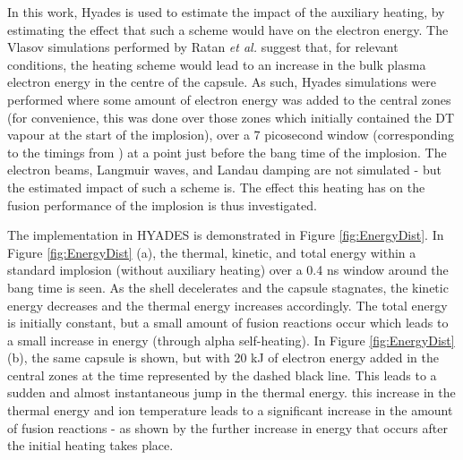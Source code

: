 In this work, Hyades is used to estimate the impact of the auxiliary heating, by estimating the effect that such a scheme would have on the electron energy. The Vlasov simulations performed by Ratan \textit{et al.} suggest that, for relevant conditions, the heating scheme would lead to an increase in the bulk plasma electron energy in the centre of the capsule. As such, Hyades simulations were performed where some amount of electron energy was added to the central zones (for convenience, this was done over those zones which initially contained the DT vapour at the start of the implosion), over a 7 picosecond window (corresponding to the timings from \cite{Ratan2017}) at a point just before the bang time of the implosion. The electron beams, Langmuir waves, and Landau damping are not simulated - but the estimated impact of such a scheme is. The effect this heating has on the fusion performance of the implosion is thus investigated.

The implementation in HYADES is demonstrated in Figure \ref{fig:EnergyDist}. In Figure \ref{fig:EnergyDist} (a), the thermal, kinetic, and total energy within a standard implosion (without auxiliary heating) over a 0.4 ns window around the bang time is seen. As the shell decelerates and the capsule stagnates, the kinetic energy decreases and the thermal energy increases accordingly. The total energy is initially constant, but a small amount of fusion reactions occur which leads to a small increase in energy (through alpha self-heating). In Figure \ref{fig:EnergyDist} (b), the same capsule is shown, but with 20 kJ of electron energy added in the central zones at the time represented by the dashed black line. This leads to a sudden and almost instantaneous jump in the thermal energy. this increase in the thermal energy and ion temperature leads to a significant increase in the amount of fusion reactions - as shown by the further increase in energy that occurs after the initial heating takes place.

